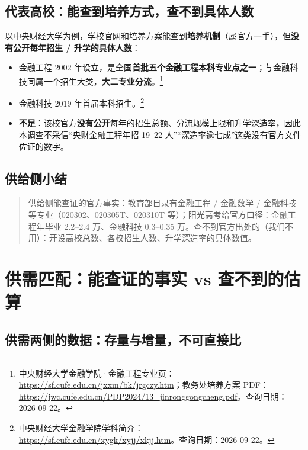 \documentclass[UTF8,11pt]{ctexart}
\begin{document}
\subsection{代表高校：能查到培养方式，查不到具体人数}

以中央财经大学为例，学校官网和培养方案能查到\textbf{培养机制}（属官方一手），但\textbf{没有公开每年招生 / 升学的具体人数}：
\begin{itemize}[itemsep=2pt]
\item 金融工程 2002 年设立，是全国\textbf{首批五个金融工程本科专业点之一}；与金融科技同属一个招生大类，\textbf{大二专业分流}。\footnote{中央财经大学金融学院·金融工程专业页：\url{https://sf.cufe.edu.cn/jxxm/bk/jrgczy.htm}；教务处培养方案 PDF：\url{https://jwc.cufe.edu.cn/PDP2024/13_jinronggongcheng.pdf}。查询日期：2026-09-22。}
\item 金融科技 2019 年首届本科招生。\footnote{中央财经大学金融学院学科简介：\url{https://sf.cufe.edu.cn/xygk/xyjj/xkjj.htm}。查询日期：2026-09-22。}
\item \textbf{不足}：该校官方\textbf{没有公开}每年的招生总额、分流规模上限和升学深造率，因此本调查不采信“央财金融工程年招 19--22 人”“深造率逾七成”这类没有官方文件佐证的数字。
\end{itemize}

\subsection{供给侧小结}

\begin{quote}\sloppy
供给侧能查证的官方事实：教育部目录有金融工程 / 金融数学 / 金融科技等专业（020302、020305T、020310T 等）；阳光高考给官方口径：金融工程年毕业 2.2--2.4 万、金融科技 0.3--0.35 万。查不到官方出处的（我们不用）：开设高校总数、各校招生人数、升学深造率的具体数值。
\end{quote}

\section{供需匹配：能查证的事实 vs 查不到的估算}

\subsection{供需两侧的数据：存量与增量，不可直接比}
\end{document}
